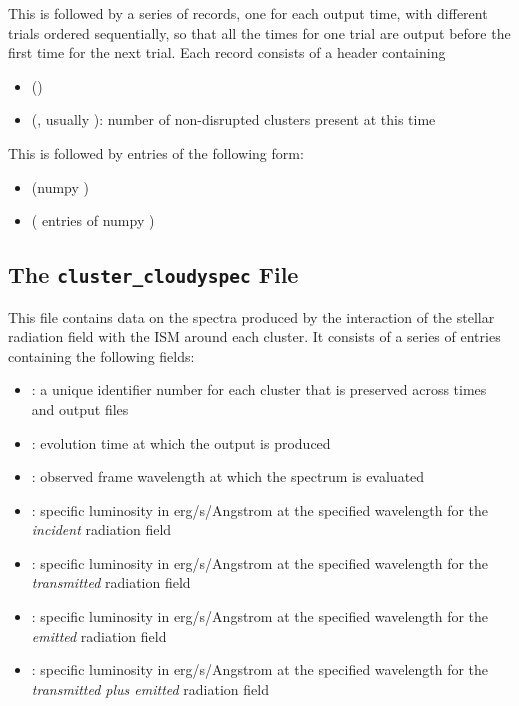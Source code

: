 \documentclass[letterpaper,10pt,english]{sphinxmanual}
\begin{document}
This is followed by a series of records, one for each output time,
with different trials ordered sequentially, so that all the times for
one trial are output before the first time for the next trial. Each
record consists of a header containing
\begin{itemize}
\item {} 
 ()

\item {} 
 (, usually ): number of non-disrupted clusters present at this time

\end{itemize}

This is followed by  entries of the following form:
\begin{itemize}
\item {} 
 (numpy )

\item {} 
 ( entries of numpy )

\end{itemize}


\subsection{The \texttt{cluster\_cloudyspec} File}
\label{cloudy:the-cluster-cloudyspec-file}
This file contains data on the spectra produced by the interaction of
the stellar radiation field with the ISM around each cluster. It
consists of a series of entries containing the following fields:
\begin{itemize}
\item {} 
: a unique identifier number for each cluster that is
preserved across times and output files

\item {} 
: evolution time at which the output is produced

\item {} 
: observed frame wavelength at which the spectrum is evaluated

\item {} 
: specific luminosity in erg/s/Angstrom at the specified
wavelength for the \emph{incident} radiation field

\item {} 
: specific luminosity in erg/s/Angstrom at the specified
wavelength for the \emph{transmitted} radiation field

\item {} 
: specific luminosity in erg/s/Angstrom at the specified
wavelength for the \emph{emitted} radiation field

\item {} 
: specific luminosity in erg/s/Angstrom
at the specified wavelength for the \emph{transmitted plus emitted}
radiation field

\end{itemize}
\end{document}
